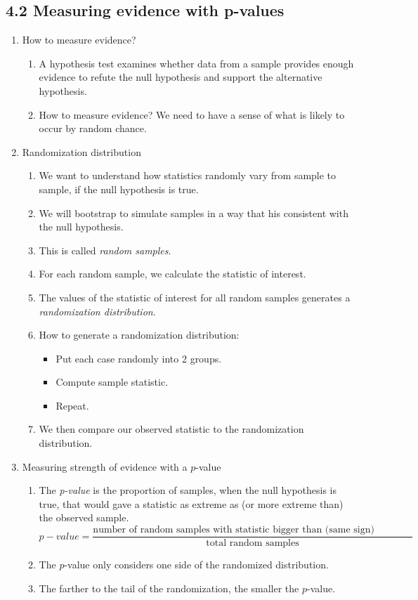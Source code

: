 \documentclass{article}
\begin{document}
\subsection{4.2 Measuring evidence with p-values}
\begin{enumerate}

\item How to measure evidence?
\begin{enumerate}
\item A hypothesis test examines whether data from a sample provides enough evidence to refute the null hypothesis and support the alternative hypothesis. 
\item How to measure evidence? We need to have a sense of what is likely to occur by random chance. 
\end{enumerate}

\item Randomization distribution
\begin{enumerate}
\item We want to understand how statistics randomly vary from sample to sample, if the null hypothesis is true. 
\item We will bootstrap to simulate samples in a way that his consistent with the null hypothesis.
\item This is called \emph{random samples}.
\item For each random sample, we calculate the statistic of interest.
\item The values of the statistic of interest for all random samples generates a \emph{randomization distribution}.
\item How to generate a randomization distribution:
\begin{itemize}
\item Put each case randomly into 2 groups.
\item Compute sample statistic.
\item Repeat.
\end{itemize}
\item We then compare our observed statistic to the randomization distribution.
\end{enumerate}

\item Measuring strength of evidence with a $p$-value
\begin{enumerate}
\item The \emph{p-value} is the proportion of samples, when the null hypothesis is true, that would gave a statistic as extreme as (or more extreme than) the observed sample.
\[
p-value = \frac{\text{number of random samples with statistic bigger than (same sign) observed stat}}{\text{total random samples}}
\]
\item The $p$-value only considers one side of the randomized distribution.
\item The farther to the tail of the randomization, the smaller the $p$-value.
\end{enumerate}


\end{enumerate}
\end{document}

